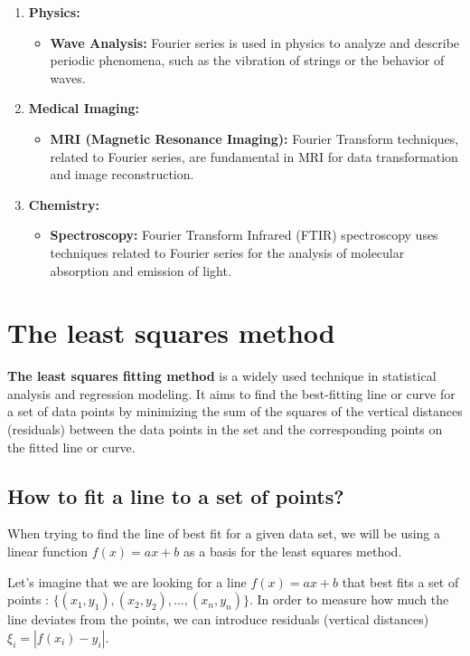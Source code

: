 \documentclass{MathematicaReport}
\begin{document}
\begin{enumerate}[label=\arabic*.]
    \item \textbf{Physics:}
    \begin{itemize}
	\item \textbf{Wave Analysis:} Fourier series is used in physics to
	analyze and describe periodic phenomena, such as the vibration of
	strings or the behavior of waves.
    \end{itemize}
    
    \item \textbf{Medical Imaging:}
    \begin{itemize}
	\item \textbf{MRI (Magnetic Resonance Imaging):} Fourier Transform
	techniques, related to Fourier series, are fundamental in MRI for data
	transformation and image reconstruction.
    \end{itemize}
    
    \item \textbf{Chemistry:}
    \begin{itemize}
	\item \textbf{Spectroscopy:} Fourier Transform Infrared (FTIR)
	spectroscopy uses techniques related to Fourier series for the analysis
	of molecular absorption and emission of light.
    \end{itemize}
\end{enumerate}


\section{The least squares method}
\textbf{The least squares fitting method} is a widely used technique in statistical
analysis and regression modeling. It aims to find the best-fitting line or curve
for a set of data points by minimizing the sum of the squares of the
vertical distances (residuals) between the data points in the set and the
corresponding points on the fitted line or curve. 

\subsection{How to fit a line to a set of points?}
When trying to find the line of best fit for a given data set, we will be using
a linear function \( f(x) = ax + b \)  as a basis for the least squares method.

Let's imagine that we are looking for a line \( f(x) = ax + b \) that best fits 
a set of points : \( \{(x_1,y_1), (x_2,y_2),\ldots,(x_n,y_n)\} \). 
In order to measure how much the line deviates from the points, we can introduce
residuals (vertical distances) \( \xi_i = | f(x_i) - y_i |  \). 
\end{document}
